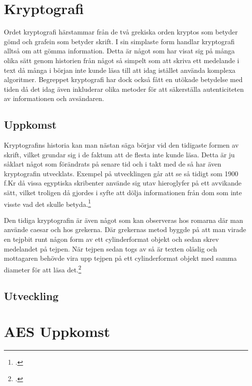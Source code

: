 
\section{Kryptografi} %
Ordet kryptografi härstammar från de två grekiska orden
kryptos som betyder gömd och grafein som betyder skrift.
I sin simplaste form handlar kryptografi alltså om att
gömma information. Detta är något som har visat sig på många
olika sätt genom historien från något så simpelt som att skriva
ett medelande i text då många i början inte kunde läsa till
att idag istället använda komplexa algoritmer.
Begreppet kryptografi har dock också fått en utökade betydelse
med tiden då det idag även inkluderar olika metoder för att
säkerställa autenticiteten av informationen och avsändaren.

\subsection{Uppkomst} %
Kryptografins historia kan man nästan säga börjar vid den
tidigaste formen av skrift, vilket grundar sig i de faktum att
de flesta inte kunde läsa. Detta är ju såklart något som förändrats
på senare tid och i takt med de så har även kryptografin utvecklats.
Exempel på utvecklingen går att se så tidigt som 1900 f.Kr då vissa egyptiska
skribenter använde sig utav hieroglyfer på ett avvikande sätt, vilket
troligen då gjordes i syfte att dölja informationen från dom som inte
visste vad det skulle betyda.\footcite{kryptografi-historia-1}

Den tidiga kryptografin är även något som kan observeras hos romarna där
man använde \gls{caesar} och hos grekerna. Där grekernas metod byggde på
att man virade en tejpbit runt någon form av ett cylinderformat objekt
och sedan skrev medelandet på tejpen. När tejpen sedan togs av så är texten %
oläslig och mottagaren behövde vira upp tejpen på ett cylinderformat objekt
med samma diameter för att läsa det.\footcite{kryptografi-historia-1}

\subsection{Utveckling} %

\section{AES Uppkomst} %

